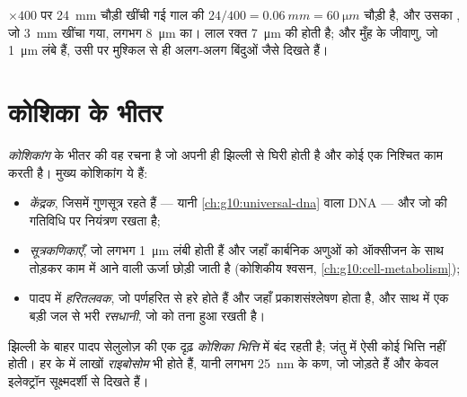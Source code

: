 \begin{example}[गाल की कोशिकाएँ]\label{ex:g10:cells-common-unit:cheek}
$\times 400$ पर \qty{24}{mm} चौड़ी खींची गई गाल की 
$24/400 = \qty{0.06}{mm} = \qty{60}{\micro m}$ चौड़ी है, और उसका
, जो \qty{3}{mm} खींचा गया, लगभग \qty{8}{\micro m} का। लाल रक्त
 \qty{7}{\micro m} की होती है; और मुँह के जीवाणु, जो
\qty{1}{\micro m} लंबे हैं, उसी  पर मुश्किल से ही अलग-अलग
बिंदुओं जैसे दिखते हैं।
\end{example}

\section{कोशिका के भीतर}

\begin{definition}[कोशिकांग]\label{def:g10:cells-common-unit:organelle}
\emph{कोशिकांग}  के भीतर की वह रचना है जो अपनी ही
झिल्ली से घिरी होती है और कोई एक निश्चित काम करती है। मुख्य कोशिकांग ये
हैं:
\begin{itemize}
  \item \emph{केंद्रक}, जिसमें गुणसूत्र रहते हैं --- यानी
        \cref{ch:g10:universal-dna} वाला DNA --- और जो  की
        गतिविधि पर नियंत्रण रखता है;
  \item \emph{सूत्रकणिकाएँ}, जो लगभग
        \qty{1}{\micro m} लंबी होती हैं और जहाँ कार्बनिक अणुओं को
        ऑक्सीजन के साथ तोड़कर काम में आने वाली ऊर्जा छोड़ी जाती है
        (कोशिकीय श्वसन, \cref{ch:g10:cell-metabolism});
  \item पादप  में \emph{हरितलवक}, जो पर्णहरित से
        हरे होते हैं और जहाँ प्रकाशसंश्लेषण होता है, और साथ में एक बड़ी
        जल से भरी \emph{रसधानी}, जो  को तना हुआ रखती
        है।
\end{itemize}
झिल्ली के बाहर पादप  सेलुलोज़ की एक दृढ़
\emph{कोशिका भित्ति} में बंद रहती है; जंतु 
में ऐसी कोई भित्ति नहीं होती। हर  के  में लाखों
\emph{राइबोसोम} भी होते हैं, यानी लगभग \qty{25}{nm} के
कण, जो  जोड़ते हैं और केवल इलेक्ट्रॉन सूक्ष्मदर्शी से दिखते हैं।
\end{definition}


